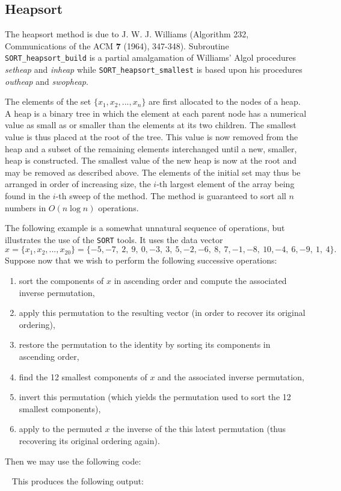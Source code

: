 \documentclass{galahad}
\newcommand{\packagename}{SORT}
\begin{document}
\subsection{Heapsort}

The heapsort method is due to J. W. J.  Williams (Algorithm 232,
Communications of the ACM
{\bf 7 } (1964), 347-348).  Subroutine {\tt \packagename\_heapsort\_build}
is a partial amalgamation of Williams' Algol procedures {\em setheap}
and {\em inheap} while {\tt \packagename\_heapsort\_smallest}
is based upon his procedures {\em outheap} and {\em swopheap}.

\noindent
The elements of the set $\{ x_1 ,   x_2 ,  ...  ,  x_n \}$
are first allocated to the nodes of a heap.  A heap is a binary
tree in which the element at each parent node has a numerical
value as small as or smaller than the elements at its two children.
The smallest value is
thus placed at the root of the tree. This value is now removed from
the heap and a subset of the remaining elements interchanged until a
new, smaller, heap is constructed.  The smallest value of the new heap
is now at the root and may be removed as described above. The elements
of the initial set may thus be arranged in order of increasing size,
the $i$-th largest element of the array being found in the $i$-th
sweep of the method.  The method is guaranteed to sort all $n$ numbers
in $O( n \log n )$ operations.


\galexample
The following example is a somewhat unnatural sequence of operations, but
illustrates the use of the {\tt \packagename} tools. It uses the data vector
\[
x = \{ x_1 ,   x_2 ,  ...  , x_{20} \} =
\{ -5,  -7,  ~2,  ~9,  ~0,  -3,  ~3,  ~5,  -2,  -6,
 ~8,  ~7,  -1,  -8,  ~10,  -4,  ~6,  -9,  ~1,  ~4 \}.
\]
Suppose now that we wish to perform the following successive operations:
\begin{enumerate}
\item sort the components of $x$ in ascending order and compute the associated
inverse permutation,
\item apply this permutation to the resulting vector (in order to recover its
original ordering),
\item restore the permutation to the identity by sorting its components in
ascending order,
\item find the 12 smallest components of $x$ and the associated inverse
permutation,
\item invert this permutation (which yields the permutation used to sort the
12 smallest components),
\item
apply to the permuted $x$ the inverse of the this latest permutation (thus
recovering its original ordering again).
\end{enumerate}
Then we may use the following code:


{\tt \small
\VerbatimInput{\packageexample}
}
\noindent
This produces the following output:
{\tt \small
\VerbatimInput{\packageresults}
}
\end{document}
